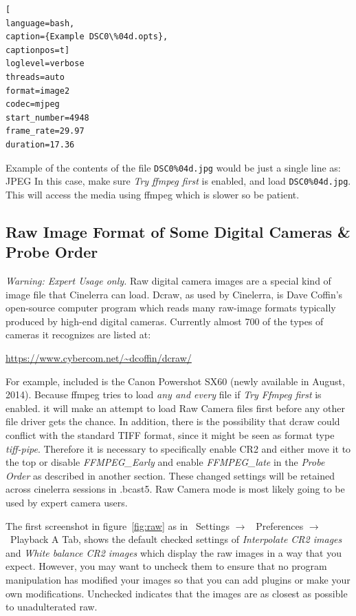 \begin{lstlisting}[
language=bash,
caption={Example DSC0\%04d.opts},
captionpos=t]
loglevel=verbose
threads=auto
format=image2
codec=mjpeg 
start_number=4948
frame_rate=29.97
duration=17.36
\end{lstlisting}

Example of the contents of the file \texttt{DSC0\%04d.jpg} would be just a single line as:  JPEG
In this case, make sure \textit{Try ffmpeg first} is enabled, and load \texttt{DSC0\%04d.jpg}.  
This will access the media using ffmpeg which is slower so be patient.

\subsection{Raw Image Format of Some Digital Cameras \& Probe Order}%
\label{sub:raw_image_format_digital_camera_probe_order}

\textit{Warning: Expert Usage only.}  Raw digital camera images are a special kind of image file that Cinelerra can load. Dcraw, as used by Cinelerra, is Dave Coffin’s open-source computer program which reads many raw-image formats typically produced by high-end digital cameras.  Currently almost 700 of the types of cameras it recognizes are listed at:

\vspace*{1ex} \url{https://www.cybercom.net/~dcoffin/dcraw/}

\vspace*{1ex} \noindent For example, included is the Canon Powershot SX60 (newly available in August, 2014).  Because ffmpeg tries to load \textit{any and every} file if \textit{Try Ffmpeg first} is enabled. it will make an attempt to load Raw Camera files first before any other file driver gets the chance.  In addition, there is the possibility that dcraw could conflict with the standard TIFF format, since it might be seen as format type \textit{tiff-pipe}.  Therefore it is necessary to specifically enable CR2 and either move it to the top or disable \textit{FFMPEG\_Early} and enable \textit{FFMPEG\_late} in the \textit{Probe Order} as described in another section.  These changed settings will be retained across cinelerra sessions in .bcast5.  Raw Camera mode is most likely going to be used by expert camera users.

The first screenshot in figure~\ref{fig:raw} as in ~Settings $\rightarrow$ ~Preferences $\rightarrow$ ~Playback A Tab, shows the default checked settings of \textit{Interpolate CR2 images} and \textit{White balance CR2 images} which display the raw images in a way that you expect.  However, you may want to uncheck them to ensure that no program manipulation has modified your images so that you can add plugins or make your own modifications.  Unchecked indicates that the images are as closest as possible to unadulterated raw.

